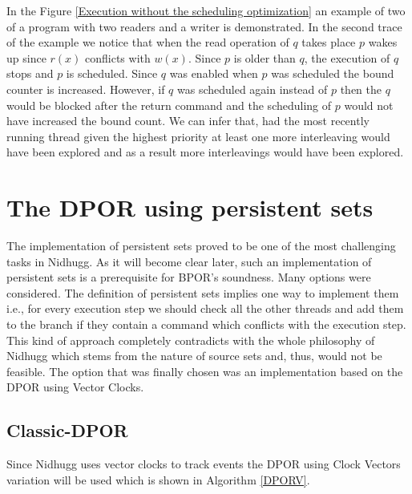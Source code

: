In the Figure \ref{Execution without the scheduling optimization} an example of two of a program with two readers and a writer is demonstrated.
In the second trace of the example we notice that when the read operation of $q$ takes place $p$ wakes up since $r(x)$ conflicts with $w(x)$. Since $p$
is older than $q$, the execution of $q$ stops and $p$ is scheduled. Since $q$ was enabled when $p$ was scheduled the bound counter is increased. However,
if $q$ was scheduled again instead of $p$ then the $q$ would be blocked after the return command and the scheduling of $p$ would not have increased the 
bound count. We can infer that, had the most recently running thread given the highest priority at least one more interleaving would have
been explored and as a result more interleavings would have been explored.

\section{The DPOR using persistent sets}

The implementation of persistent sets proved to be one of the most challenging tasks in Nidhugg. As it will become clear later, such an implementation
of persistent sets is a prerequisite for BPOR's soundness. Many options were considered. The definition of persistent sets implies one 
way to implement them i.e., for every execution step we should
check all the other threads and add them to the branch if they contain a command which conflicts with the execution step. This kind of approach
completely contradicts with the whole philosophy of Nidhugg which stems from the nature of source sets and, thus, would not be feasible. 
The option that was finally chosen was an implementation based on the DPOR using Vector Clocks.

\subsection{Classic-DPOR}

Since Nidhugg uses vector clocks to track events the DPOR using Clock Vectors variation will be used which is shown in Algorithm \ref{DPORV}.


